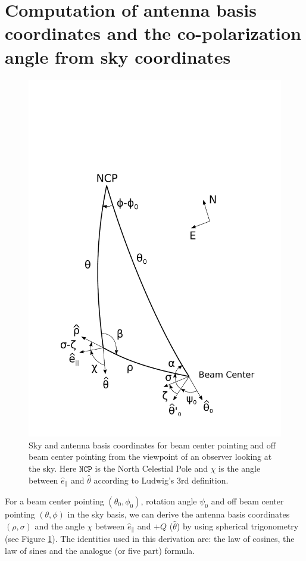 \documentclass[a4paper,11pt]{article}
\newcommand{\co}{\mathbin{\|}}
\begin{document}



\appendix
\section{Computation of antenna basis coordinates and the co-polarization angle from sky coordinates}
%
\begin{figure}
	\centering
	\includegraphics[width=0.8\linewidth]{figures/Figure10_Lu3_3.pdf}
	\caption{Sky and antenna basis coordinates for beam center pointing and off beam center pointing from the viewpoint of an observer looking at the sky. Here $\mathrm{\texttt{NCP}}$ is the 
		     North Celestial Pole and $\chi$ is the angle between $\hat{e}_{\co}$ and $\hat{\theta}$ according to Ludwig's 3rd definition. }
	\label{fig::figure10}
\end{figure}
%
For a beam center pointing $(\theta_0, \phi_0)$, rotation angle $\psi_0$ and off beam center pointing $(\theta, \phi)$ in the sky basis, we can derive the antenna basis coordinates $(\rho,\sigma)$ and the angle $\chi$ between $\hat{e}_{\co}$ and $+Q$ ($\hat{\theta}$) by using spherical trigonometry (see Figure \ref{fig::figure10}). The identities used in this derivation are: the law of cosines, the law of sines and the analogue (or five part) formula.
\end{document}
